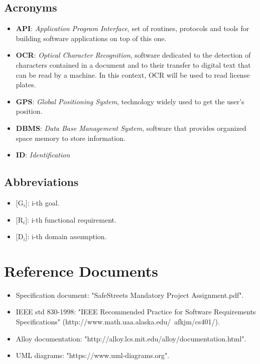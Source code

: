 \documentclass{report}
\begin{document}
\subsection{Acronyms}
\begin{itemize}
\item \textbf{API}: \textit{Application Program Interface}, set of routines, protocols and tools for building software applications on top of this one.
\item \textbf{OCR}: \textit{Optical Character Recognition}, software dedicated to the detection of characters contained in a document and to their transfer to digital text that can be read by a machine. In this context, OCR will be used to read license plates.
\item \textbf{GPS}: \textit{Global Positioning System}, technology widely used to get the user's position.
\item \textbf{DBMS}: \textit{Data Base Management System}, software that provides organized space memory to store information.
\item \textbf{ID}: \textit{Identification}
\end{itemize}
\subsection{Abbreviations}
\begin{itemize}
\item {[G$_{i}$]}: i-th goal.
\item {[R$_{i}$]}: i-th functional requirement.
\item {[D$_{i}$]}: i-th domain assumption.
\end{itemize}
\section{Reference Documents}
\begin{itemize}
	\item Specification document: "SafeStreets Mandatory Project Assignment.pdf".
	\item IEEE std 830-1998: "IEEE Recommended Practice for Software Requirements Specifications" (http://www.math.uaa.alaska.edu/~afkjm/cs401/).
	\item Alloy documentation: "http://alloy.lcs.mit.edu/alloy/documentation.html".
	\item UML diagrams: "https://www.uml-diagrams.org".
\end{itemize}
\end{document}
